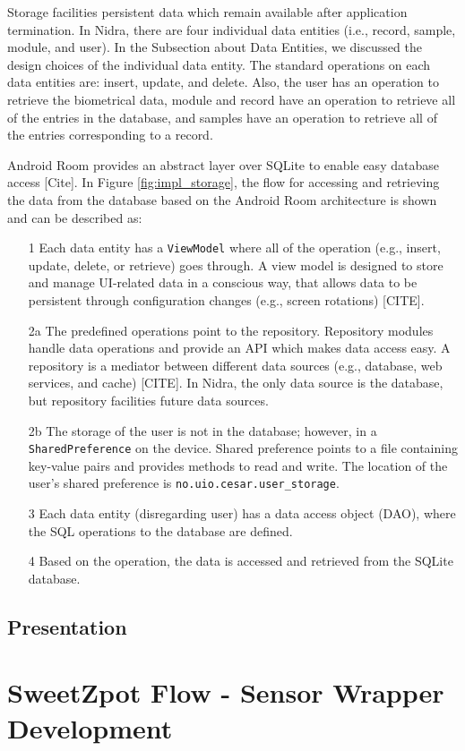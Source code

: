 Storage facilities persistent data which remain available after application termination. In Nidra, there are four individual data entities (i.e., record, sample, module, and user). In the Subsection about Data Entities, we discussed the design choices of the individual data entity. The standard operations on each data entities are: insert, update, and delete. Also, the user has an operation to retrieve the biometrical data, module and record have an operation to retrieve all of the entries in the database, and samples have an operation to retrieve all of the entries corresponding to a record. 

Android Room provides an abstract layer over SQLite to enable easy database access [Cite]. In Figure \ref{fig:impl_storage}, the flow for accessing and retrieving the data from the database based on the Android Room architecture is shown and can be described as:

\begin{itemize}
	\item[1] Each data entity has a \verb|ViewModel| where all of the operation (e.g., insert, update, delete, or retrieve) goes through.  A view model is designed to store and manage UI-related data in a conscious way, that allows data to be persistent through configuration changes (e.g., screen rotations) [CITE]. 
 	\item[2a] The predefined operations point to the repository. Repository modules handle data operations and provide an API  which makes data access easy. A repository is a mediator between different data sources (e.g., database, web services, and cache) [CITE]. In Nidra, the only data source is the database, but repository facilities future data sources. 
	\item[2b] The storage of the user is not in the database; however, in a \verb|SharedPreference| on the device. Shared preference points to a file containing key-value pairs and provides methods to read and write. The location of the user's shared preference is \verb|no.uio.cesar.user_storage|. 
	\item[3] Each data entity (disregarding user) has a data access object (DAO), where the SQL operations to the database are defined. 
	\item[4] Based on the operation, the data is accessed and retrieved from the SQLite database.
\end{itemize}




\subsection{Presentation}


\section{SweetZpot Flow - Sensor Wrapper Development}